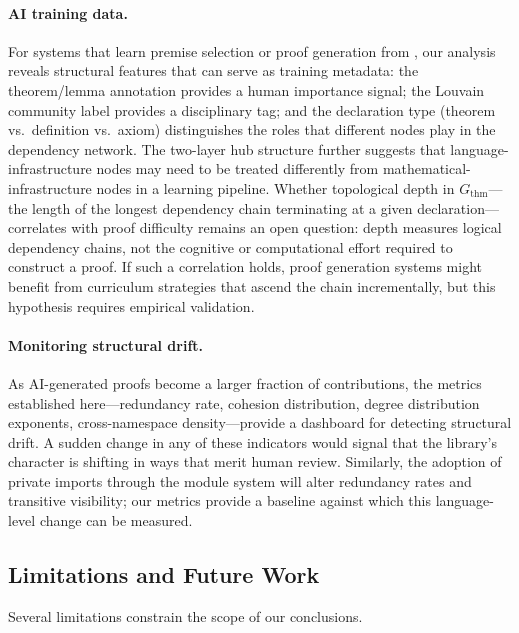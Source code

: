 \paragraph{AI training data.} For systems that learn premise selection or proof generation from , our analysis reveals structural features that can serve as training metadata: the theorem/lemma annotation provides a human importance signal; the Louvain community label provides a disciplinary tag; and the declaration type (theorem vs.\ definition vs.\ axiom) distinguishes the roles that different nodes play in the dependency network. The two-layer hub structure further suggests that language-infrastructure nodes may need to be treated differently from mathematical-infrastructure nodes in a learning pipeline. Whether topological depth in $G_{\mathrm{thm}}$---the length of the longest dependency chain terminating at a given declaration---correlates with proof difficulty remains an open question: depth measures logical dependency chains, not the cognitive or computational effort required to construct a proof. If such a correlation holds, proof generation systems might benefit from curriculum strategies that ascend the chain incrementally, but this hypothesis requires empirical validation.

\paragraph{Monitoring structural drift.} As AI-generated proofs become a larger fraction of  contributions, the metrics established here---redundancy rate, cohesion distribution, degree distribution exponents, cross-namespace density---provide a dashboard for detecting structural drift. A sudden change in any of these indicators would signal that the library's character is shifting in ways that merit human review. Similarly, the adoption of private imports through the module system will alter redundancy rates and transitive visibility; our metrics provide a baseline against which this language-level change can be measured.

\subsection{Limitations and Future Work}
\label{sec:limitations}

Several limitations constrain the scope of our conclusions.


